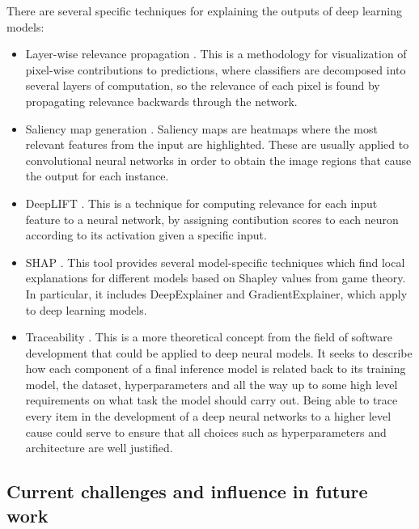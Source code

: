 There are several specific techniques for explaining the outputs of deep learning models:
\begin{itemize}
\item Layer-wise relevance propagation . This is a methodology for visualization of pixel-wise contributions to predictions, where classifiers are decomposed into several layers of computation, so the relevance of each pixel is found by propagating relevance backwards through the network.
\item Saliency map generation . Saliency maps are heatmaps where the most relevant features from the input are highlighted. These are usually applied to convolutional neural networks in order to obtain the image regions that cause the output for each instance.
\item DeepLIFT . This is a technique for computing relevance for each input feature to a neural network, by assigning contibution scores to each neuron according to its activation given a specific input.
\item SHAP . This tool provides several model-specific techniques which find local explanations for different models based on Shapley values from game theory. In particular, it includes DeepExplainer and GradientExplainer, which apply to deep learning models.
\item Traceability . This is a more theoretical concept from the field of software development that could be applied to deep neural models. It seeks to describe how each component of a final inference model is related back to its training model, the dataset, hyperparameters and all the way up to some high level requirements on what task the model should carry out. Being able to trace every item in the development of a deep neural networks to a higher level cause could serve to ensure that all choices such as hyperparameters and architecture are well justified.
\end{itemize}



\subsection{Current challenges and influence in future work}

